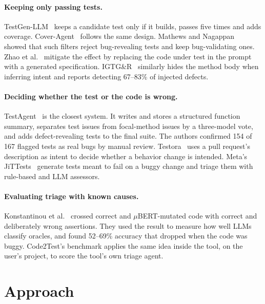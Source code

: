 \documentclass[11pt]{article}
\newcommand{\toolname}{Code2Test}
\begin{document}
\paragraph{Keeping only passing tests.}
TestGen-LLM~\cite{alshahwan2024testgenllm} keeps a candidate test only if it builds, passes five times and adds coverage.
Cover-Agent~\cite{qodo2024coveragent} follows the same design.
Mathews and Nagappan~\cite{mathews2024design} showed that such filters reject bug-revealing tests and keep bug-validating ones.
Zhao et al.~\cite{zhao2026misguidance} mitigate the effect by replacing the code under test in the prompt with a generated specification.
IGTG\&R~\cite{liu2026igtgr} similarly hides the method body when inferring intent and reports detecting 67--83\% of injected defects.

\paragraph{Deciding whether the test or the code is wrong.}
TestAgent~\cite{zhang2026testagent} is the closest system.
It writes and stores a structured function summary, separates test issues from focal-method issues by a three-model vote, and adds defect-revealing tests to the final suite.
The authors confirmed 154 of 167 flagged tests as real bugs by manual review.
Testora~\cite{pradel2026testora} uses a pull request's description as intent to decide whether a behavior change is intended.
Meta's JiTTests~\cite{becker2026jittest} generate tests meant to fail on a buggy change and triage them with rule-based and LLM assessors.

\paragraph{Evaluating triage with known causes.}
Konstantinou et al.~\cite{konstantinou2024oracles} crossed correct and $\mu$BERT-mutated code with correct and deliberately wrong assertions.
They used the result to measure how well LLMs classify oracles, and found 52--69\% accuracy that dropped when the code was buggy.
\toolname{}'s benchmark applies the same idea inside the tool, on the user's project, to score the tool's own triage agent.

\section{Approach}\label{sec:approach}
\end{document}
